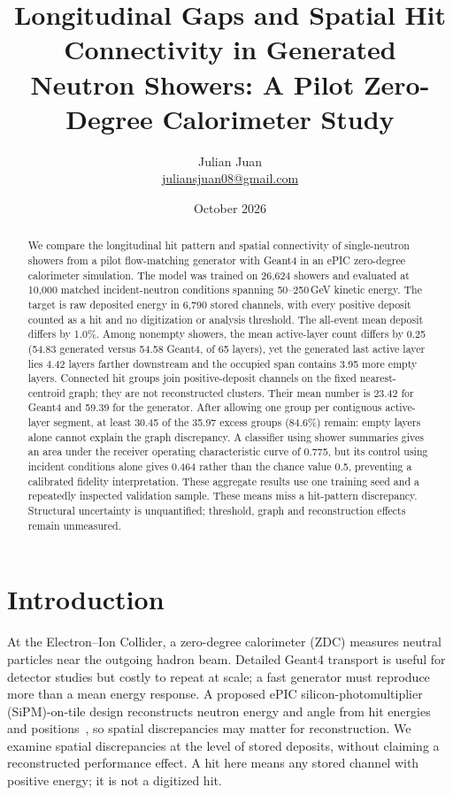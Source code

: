 \documentclass[10pt]{article}
\title{Longitudinal Gaps and Spatial Hit Connectivity in Generated\\Neutron Showers: A Pilot Zero-Degree Calorimeter Study}
\author{Julian Juan\\[3pt]\small\href{mailto:juliansjuan08@gmail.com}{juliansjuan08@gmail.com}}
\date{October 2026}
\begin{document}
\maketitle

\begin{abstract}
We compare the longitudinal hit pattern and spatial connectivity of single-neutron showers from a pilot flow-matching generator with Geant4 in an ePIC zero-degree calorimeter simulation. The model was trained on 26,624 showers and evaluated at 10,000 matched incident-neutron conditions spanning 50--250\,GeV kinetic energy. The target is raw deposited energy in 6,790 stored channels, with every positive deposit counted as a hit and no digitization or analysis threshold. The all-event mean deposit differs by 1.0\%. Among nonempty showers, the mean active-layer count differs by 0.25 (54.83 generated versus 54.58 Geant4, of 65 layers), yet the generated last active layer lies 4.42 layers farther downstream and the occupied span contains 3.95 more empty layers. Connected hit groups join positive-deposit channels on the fixed nearest-centroid graph; they are not reconstructed clusters. Their mean number is 23.42 for Geant4 and 59.39 for the generator. After allowing one group per contiguous active-layer segment, at least 30.45 of the 35.97 excess groups (84.6\%) remain: empty layers alone cannot explain the graph discrepancy. A classifier using shower summaries gives an area under the receiver operating characteristic curve of 0.775, but its control using incident conditions alone gives 0.464 rather than the chance value 0.5, preventing a calibrated fidelity interpretation. These aggregate results use one training seed and a repeatedly inspected validation sample. These means miss a hit-pattern discrepancy. Structural uncertainty is unquantified; threshold, graph and reconstruction effects remain unmeasured.
\end{abstract}

\section{Introduction}

At the Electron--Ion Collider, a zero-degree calorimeter (ZDC) measures neutral particles near the outgoing hadron beam. Detailed Geant4 transport is useful for detector studies but costly to repeat at scale; a fast generator must reproduce more than a mean energy response. A proposed ePIC silicon-photomultiplier (SiPM)-on-tile design reconstructs neutron energy and angle from hit energies and positions~\cite{epiczdc}, so spatial discrepancies may matter for reconstruction. We examine spatial discrepancies at the level of stored deposits, without claiming a reconstructed performance effect. A hit here means any stored channel with positive energy; it is not a digitized hit.
\end{document}
